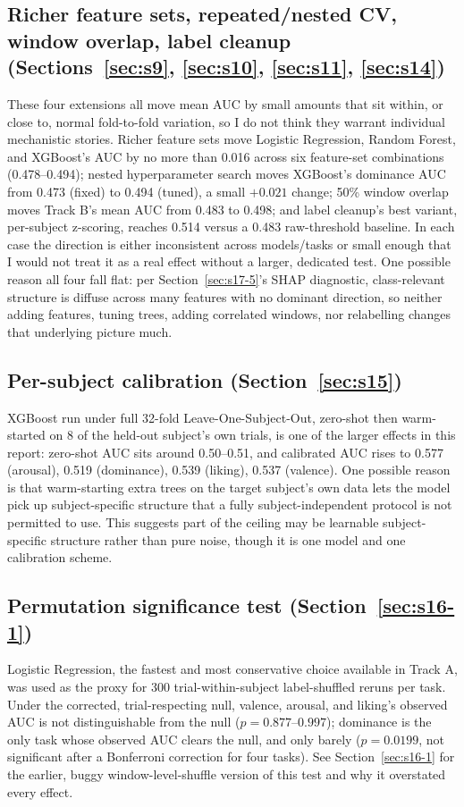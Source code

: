 \documentclass[11pt]{report}
\begin{document}
\subsection{Richer feature sets, repeated/nested CV, window overlap, label
cleanup (Sections~\ref{sec:s9}, \ref{sec:s10}, \ref{sec:s11}, \ref{sec:s14})}
These four extensions all move mean AUC by small amounts that sit within,
or close to, normal fold-to-fold variation, so I do not think they warrant
individual mechanistic stories. Richer feature sets move Logistic
Regression, Random Forest, and XGBoost's AUC by no more than 0.016 across
six feature-set combinations (0.478--0.494); nested hyperparameter search
moves XGBoost's dominance AUC from 0.473 (fixed) to 0.494 (tuned), a small
$+0.021$ change; 50\% window overlap moves Track B's mean AUC from 0.483 to
0.498; and label cleanup's best variant, per-subject z-scoring, reaches
0.514 versus a 0.483 raw-threshold baseline. In each case the direction is
either inconsistent across models/tasks or small enough that I would not
treat it as a real effect without a larger, dedicated test. One possible
reason all four fall flat: per Section~\ref{sec:s17-5}'s SHAP diagnostic,
class-relevant structure is diffuse across many features with no dominant
direction, so neither adding features, tuning trees, adding correlated
windows, nor relabelling changes that underlying picture much.

\subsection{Per-subject calibration (Section~\ref{sec:s15})}
XGBoost run under full 32-fold Leave-One-Subject-Out, zero-shot then
warm-started on 8 of the held-out subject's own trials, is one of the
larger effects in this report: zero-shot AUC sits around 0.50--0.51, and
calibrated AUC rises to 0.577 (arousal), 0.519 (dominance), 0.539 (liking),
0.537 (valence). One possible reason is that warm-starting extra trees on
the target subject's own data lets the model pick up subject-specific
structure that a fully subject-independent protocol is not permitted to
use. This suggests part of the ceiling may be learnable subject-specific
structure rather than pure noise, though it is one model and one
calibration scheme.

\subsection{Permutation significance test (Section~\ref{sec:s16-1})}
Logistic Regression, the fastest and most conservative choice available in
Track A, was used as the proxy for 300 trial-within-subject label-shuffled
reruns per task. Under the corrected, trial-respecting null, valence,
arousal, and liking's observed AUC is not distinguishable from the null
($p=0.877$--$0.997$); dominance is the only task whose observed AUC clears
the null, and only barely ($p=0.0199$, not significant after a Bonferroni
correction for four tasks). See Section~\ref{sec:s16-1} for the earlier,
buggy window-level-shuffle version of this test and why it overstated every
effect.
\end{document}
